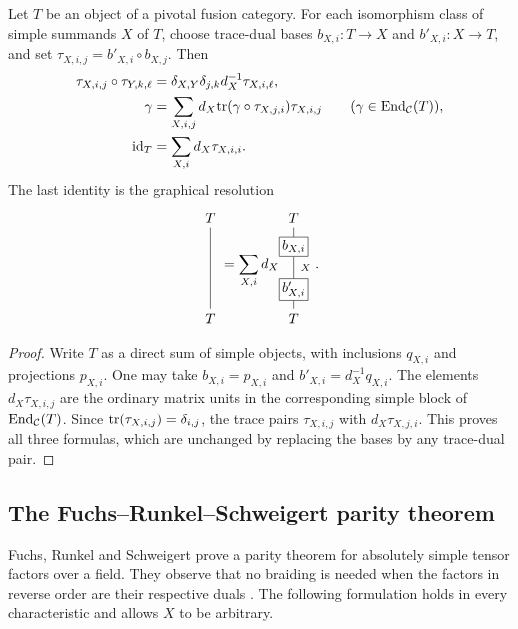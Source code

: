 \documentclass{amsart}
\begin{document}
\begin{proposition}\label{prop:basis2}
Let $T$ be an object of a pivotal fusion category. For each isomorphism class
of simple summands $X$ of $T$, choose trace-dual bases
$b_{X,i}:T\to X$ and $b'_{X,i}:X\to T$, and set
$\tau_{X,i,j}=b'_{X,i}\circ b_{X,j}$. Then
\begin{align*}
 \tau_{X,i,j}\circ\tau_{Y,k,\ell}
   &=\delta_{X,Y}\delta_{j,k}d_X^{-1}\tau_{X,i,\ell},\\
 \gamma&=\sum_{X,i,j}d_X\mathrm{tr}(\gamma\circ\tau_{X,j,i})\tau_{X,i,j}
       \qquad(\gamma\in\mathrm{End}_{\mathcal{C}}(T)),\\
 \mathrm{id}_T&=\sum_{X,i}d_X\tau_{X,i,i}.
\end{align*}
The last identity is the graphical resolution
\[
\begin{tikzpicture}[baseline=(current bounding box.center),scale=.7]
\draw (0,1.46) node[above] {$T$} -- (0,-1.46) node[below] {$T$};
\end{tikzpicture}
=\sum_{X,i}d_X
\begin{tikzpicture}[baseline=(current bounding box.center),scale=.7]
\node[draw,fill=white,inner sep=2pt] (projection) at (0,.77) {$b_{X,i}$};
\node[draw,fill=white,inner sep=2pt] (inclusion) at (0,-.77) {$b'_{X,i}$};
\draw (0,1.46) node[above] {$T$} -- (projection.north);
\draw (projection.south) -- node[midway,right=1.5pt,font=\scriptsize] {$X$} (inclusion.north);
\draw (inclusion.south) -- (0,-1.46) node[below] {$T$};
\end{tikzpicture}.
\]
\end{proposition}
\begin{proof}
Write $T$ as a direct sum of simple objects, with inclusions $q_{X,i}$ and
projections $p_{X,i}$. One may take $b_{X,i}=p_{X,i}$ and
$b'_{X,i}=d_X^{-1}q_{X,i}$. The elements $d_X\tau_{X,i,j}$ are the ordinary
matrix units in the corresponding simple block of $\mathrm{End}_{\mathcal{C}}(T)$.
Since $\mathrm{tr}(\tau_{X,i,j})=\delta_{i,j}$, the trace pairs
$\tau_{X,i,j}$ with $d_X\tau_{X,j,i}$. This proves all three formulas,
which are unchanged by replacing the bases by any trace-dual pair.
\end{proof}

\subsection{The Fuchs--Runkel--Schweigert parity theorem}\label{sub:FRS}
Fuchs, Runkel and Schweigert prove a parity theorem for absolutely simple
tensor factors over a field. They observe that no braiding is needed when the
factors in reverse order are their respective duals
\cite[second theorem, p.~L257, and Remark~(2), p.~L259]{FuRuSc}. The following formulation holds in every characteristic and allows $X$ to be arbitrary.
\end{document}
